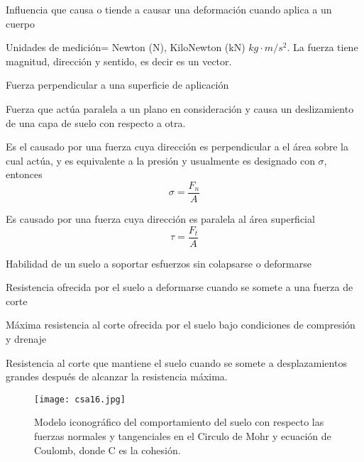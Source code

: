 \begin{definition}[Fuerza]
    Influencia que causa o tiende a causar una deformación cuando aplica a un cuerpo
\end{definition}
Unidades de medición= Newton (N), KiloNewton (kN) $kg\cdot m/s^2$. La fuerza tiene magnitud, dirección y sentido, es decir es un vector.
\begin{definition}
    Fuerza perpendicular a una superficie de aplicación
\end{definition}
\begin{definition}
    Fuerza que actúa paralela a un plano en consideración y causa un deslizamiento de una capa de suelo con respecto a otra.
\end{definition}
\begin{definition}[Esfuerzo]
    Es el causado por una fuerza cuya dirección es perpendicular a el área sobre la cual actúa, y es equivalente a la presión y usualmente es designado con $\sigma$, entonces
    \begin{equation}
        \sigma = \frac{F_n}{A}
    \end{equation}
\end{definition}
\begin{definition}
    Es causado por una fuerza cuya dirección es paralela al área superficial
    \begin{equation}
        \tau =\frac{F_t}{A}
    \end{equation}
\end{definition}
\begin{definition}
    Habilidad de un suelo a soportar esfuerzos sin colapsarse o deformarse
\end{definition}
\begin{definition}
    Resistencia ofrecida por el suelo a deformarse cuando se somete a una fuerza de corte
\end{definition}
\begin{definition}
    Máxima resistencia al corte ofrecida por el suelo bajo condiciones de compresión y drenaje
\end{definition}
\begin{definition}
    Resistencia al corte que mantiene el suelo cuando se somete a desplazamientos grandes después de alcanzar la resistencia máxima.
\end{definition}
\begin{figure}[h!]
\centering
  \texttt{[image: csa16.jpg]}
  \caption{Modelo iconográfico del comportamiento del suelo con respecto las fuerzas normales y tangenciales en el Circulo de Mohr y ecuación de Coulomb, donde C es la cohesión.}
  \label{csa16}
\end{figure}
